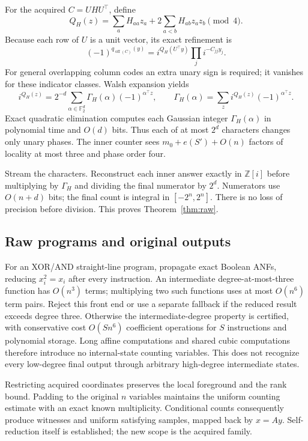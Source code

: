 \documentclass[11pt,a4paper]{article}
\newcommand{\F}{\mathbb F}\newcommand{\Z}{\mathbb Z}
\newcommand{\off}{\operatorname{off}}\newcommand{\diag}{\operatorname{diag}}
\begin{document}
For the acquired $C=UHU^\top$, define
\[
Q_H(z)=\sum_aH_{aa}z_a+2\sum_{a<b}H_{ab}z_az_b\pmod4.
\]
Because each row of $U$ is a unit vector, its exact refinement is
\[
(-1)^{q_{\off(C)}(y)}
=i^{Q_H(U^\top y)}\prod_j i^{-C_{jj}y_j}.
\]
For general overlapping column codes an extra unary sign is
required; it vanishes for these indicator classes.
Walsh expansion yields
\[
i^{Q_H(z)}=2^{-d}\sum_{\alpha\in\F_2^d}
\Gamma_H(\alpha)(-1)^{\alpha^\top z},\qquad
\Gamma_H(\alpha)=\sum_z i^{Q_H(z)}(-1)^{\alpha^\top z}.
\]
Exact quadratic elimination computes each Gaussian integer
$\Gamma_H(\alpha)$ in polynomial time and $O(d)$ bits.
Thus each of at most $2^d$ characters changes only unary phases.
The inner counter sees $m_0+e(S')+O(n)$ factors of locality at
most three and phase order four.

Stream the characters. Reconstruct each inner answer exactly in
$\Z[i]$ before multiplying by $\Gamma_H$ and dividing the final
numerator by $2^d$. Numerators use $O(n+d)$ bits; the final count
is integral in $[-2^n,2^n]$. There is no loss of precision before
division. This proves Theorem~\ref{thm:raw}.

\subsection{Raw programs and original outputs}
For an XOR/AND straight-line program, propagate exact Boolean ANFs,
reducing $x_i^2=x_i$ after every instruction. An intermediate
degree-at-most-three function has $O(n^3)$ terms; multiplying two
such functions uses at most $O(n^6)$ term pairs. Reject this
front end or use a separate fallback if the reduced result exceeds
degree three. Otherwise the intermediate-degree property is
certified, with conservative cost $O(Sn^6)$ coefficient operations
for $S$ instructions and polynomial storage.
Long affine computations and shared cubic computations therefore
introduce no internal-state counting variables. This does not
recognize every low-degree final output through arbitrary
high-degree intermediate states.

Restricting acquired coordinates preserves the local foreground
and the rank bound. Padding to the original $n$ variables maintains
the uniform counting estimate with an exact known multiplicity.
Conditional counts consequently produce witnesses and uniform
satisfying samples, mapped back by $x=Ay$. Self-reduction itself
is established; the new scope is the acquired family.
\end{document}
